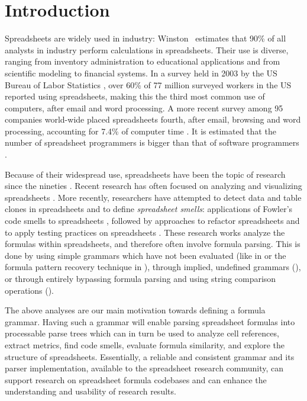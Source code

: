 \documentclass[times]{smrauth}
\begin{document}
\section{Introduction}
Spreadsheets are widely used in industry: Winston~\cite{Wins2001} estimates that 90\% of all analysts in industry perform calculations in
spreadsheets. Their use is diverse, ranging from inventory administration to educational applications and from scientific
modeling to financial systems. In a survey held in 2003 by the US Bureau of Labor Statistics \cite{stats}, over 60\% of 77 million surveyed workers in the US reported using spreadsheets, making this the third most common use of computers, after email and word processing. A more recent survey among 95 companies world-wide placed spreadsheets fourth, after email, browsing and word processing, accounting for 7.4\% of computer time \cite{stats2}. It is estimated that the number of spreadsheet programmers is bigger than that of software programmers \cite{DBLP:conf/vl/ScaffidiSM05, SANERAll}. 

Because of their widespread use, spreadsheets have been the topic of research since the nineties \cite{DBLP:journals/sigplan/BellP93}. Recent research has often focused on analyzing and visualizing spreadsheets \cite{DBLP:conf/icse/HermansPD11, Shio1999}. More recently, researchers have attempted to detect data and table clones in spreadsheets 
\cite{Hermans:clones, Dou2016} and to define \emph{spreadsheet smells}: applications of Fowler's code smells to spreadsheets \cite{DBLP:conf/icse/HermansPD12, custodes, DouCACheck}, followed by approaches to refactor spreadsheets \cite{hermans2014bumblebee,badame2012refactoring} and to apply testing practices on spreadsheets \cite{Expector}. These research works analyze the formulas within spreadsheets, and therefore often involve formula parsing. This is done by using simple grammars which have not been evaluated (like in \cite{badame2012refactoring} or the formula pattern recovery technique in \cite{DouCACheck}), through implied, undefined grammars (\cite{DBLP:conf/icse/HermansPD11, DBLP:conf/icse/HermansPD12, custodes, hermans2014bumblebee, Expector}), or through entirely bypassing formula parsing and using string comparison operations (\cite{Dou2016}).

The above analyses are our main motivation towards defining a formula grammar. Having such a grammar will enable parsing spreadsheet formulas into processable parse trees which can in turn be used to analyze cell references, extract metrics, find code smells, evaluate formula similarity, and explore the structure of spreadsheets. Essentially, a reliable and consistent grammar and its parser implementation, available to the spreadsheet research community, can support research on spreadsheet formula codebases and can enhance the understanding and usability of research results.
\end{document}
